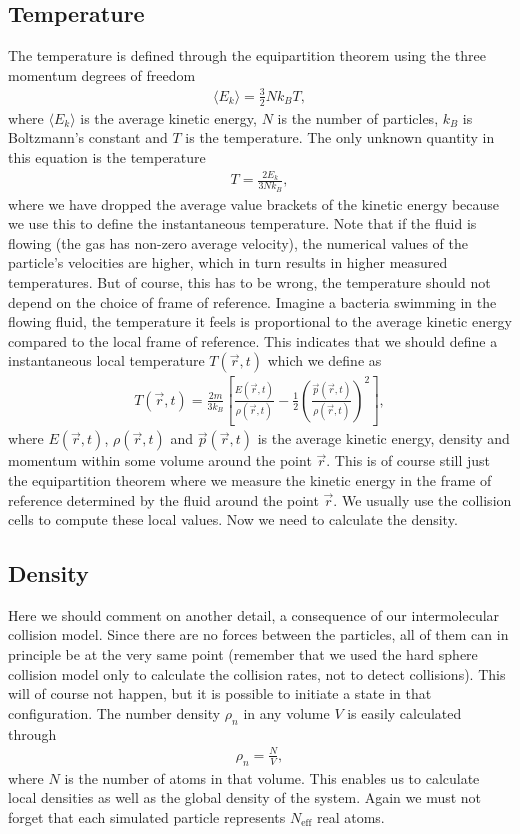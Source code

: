 \subsection{Temperature}
The temperature is defined through the equipartition theorem using the three momentum degrees of freedom
\begin{align}
	\langle E_k \rangle = \frac{3}{2}Nk_BT,
\end{align}
where $\langle E_k \rangle$ is the average kinetic energy, $N$ is the number of particles, $k_B$ is Boltzmann's constant and $T$ is the temperature. The only unknown quantity in this equation is the temperature
\begin{align}
	\label{eq:dsmc_temperature}
	T = \frac{2E_k}{3Nk_B},
\end{align}
where we have dropped the average value brackets of the kinetic energy because we use this to define the instantaneous temperature. Note that if the fluid is flowing (the gas has non-zero average velocity), the numerical values of the particle's velocities are higher, which in turn results in higher measured temperatures. But of course, this has to be wrong, the temperature should not depend on the choice of frame of reference. Imagine a bacteria swimming in the flowing fluid, the temperature it feels is proportional to the average kinetic energy compared to the local frame of reference. This indicates that we should define a instantaneous local temperature $T(\vec r, t)$ which we define as
\begin{align}
	\label{eq:dsmc_local_temperature}
	T(\vec r, t) = \frac{2m}{3k_B}\left[\frac{E(\vec r, t)}{\rho(\vec r, t)} - \frac{1}{2}\left(\frac{\vec p(\vec r, t)}{\rho(\vec r, t)}\right)^2\right],
\end{align}
where $E(\vec r,t)$, $\rho(\vec r,t)$ and $\vec p(\vec r,t)$ is the average kinetic energy, density and momentum within some volume around the point $\vec r$. This is of course still just the equipartition theorem where we measure the kinetic energy in the frame of reference determined by the fluid around the point $\vec r$. We usually use the collision cells to compute these local values. Now we need to calculate the density.
\subsection{Density}
Here we should comment on another detail, a consequence of our intermolecular collision model. Since there are no forces between the particles, all of them can in principle be at the very same point (remember that we used the hard sphere collision model only to calculate the collision rates, not to detect collisions). This will of course not happen, but it is possible to initiate a state in that configuration. The number density $\rho_n$ in any volume $V$ is easily calculated through
\begin{align}
	\rho_n = \frac{N}{V},
\end{align}
where $N$ is the number of atoms in that volume. This enables us to calculate local densities as well as the global density of the system. Again we must not forget that each simulated particle represents $N_\text{eff}$ real atoms.
